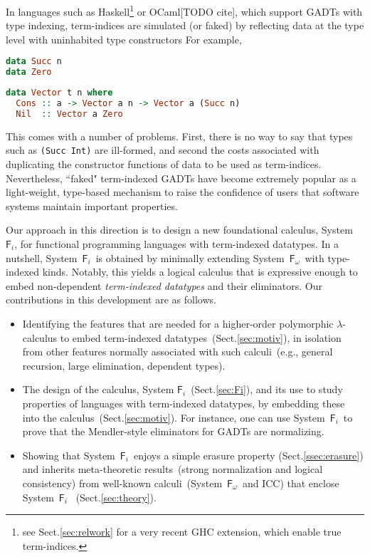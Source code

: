 \documentclass{llncs}
\newcommand{\Fi}{\ensuremath{\mathsf{F}_i}}
\newcommand{\Fw}{\ensuremath{\mathsf{F}_\omega}}
\renewcommand{\S}[0]{Sect.\;}
\begin{document}
In languages such as Haskell\footnote{see \S\ref{sec:relwork} for
	a very recent GHC extension, which enable true term-indices.}
	or OCaml[TODO cite], which support GADTs with type indexing,
term-indices are simulated (or faked) by reflecting data at the type level
with uninhabited type constructors
For example,\vspace*{-2pt}
\begin{lstlisting}[basicstyle={\ttfamily\small},language=Haskell,mathescape]
data Succ n
data Zero
\end{lstlisting}\vspace*{-8pt}
\begin{lstlisting}[basicstyle={\ttfamily\small},language=Haskell,mathescape]
data Vector t n where
  Cons :: a -> Vector a n -> Vector a (Succ n)
  Nil  :: Vector a Zero
\end{lstlisting}\vspace*{-2pt}
This comes with a number of problems. First, there is no way to say
that types such as {\tt (Succ Int)} are ill-formed, and second the costs
associated with duplicating the constructor functions of data to be used
as term-indices.
Nevertheless, ``faked" term-indexed GADTs have become extremely
popular as a light-weight, type-based mechanism
to raise the confidence of users that software systems maintain important
properties.

Our approach in this direction is to design a new foundational calculus,
System~\Fi, for functional programming languages with term-indexed
datatypes.  In a nutshell, System~\Fi\ is obtained by minimally extending
System~\Fw\ with type-indexed kinds.  Notably, this yields a logical
calculus that is expressive enough to embed non-dependent
\emph{term-indexed datatypes} and their eliminators. Our contributions in
this development are as follows.\vspace*{-.8ex}
\begin{itemize}
\item 
  Identifying the features that are needed for a higher-order polymorphic
  $\lambda$-calculus to embed term-indexed datatypes~(\S\ref{sec:motiv}),
  in isolation from other features normally associated with such
  calculi~(e.g., general recursion, large elimination, dependent types).
\item 
  The design of the calculus, System \Fi\ (\S\ref{sec:Fi}), and its use to
  study properties of languages with term-indexed datatypes, by embedding
  these into the calculus~(\S\ref{sec:motiv}).  For instance, one can use
  System~\Fi\ to prove that the Mendler-style eliminators for GADTs
  \cite{AhnShe11} are normalizing.
\item 
  Showing that System~\Fi\ enjoys a simple erasure
  property (\S\ref{ssec:erasure}) 
  and inherits meta-theoretic
  results~(strong normalization and logical consistency) from well-known
  calculi~(System~\Fw\ and ICC) that enclose System~\Fi~%
(\S\ref{sec:theory}).
\end{itemize}\vspace*{-3pt}
\end{document}
